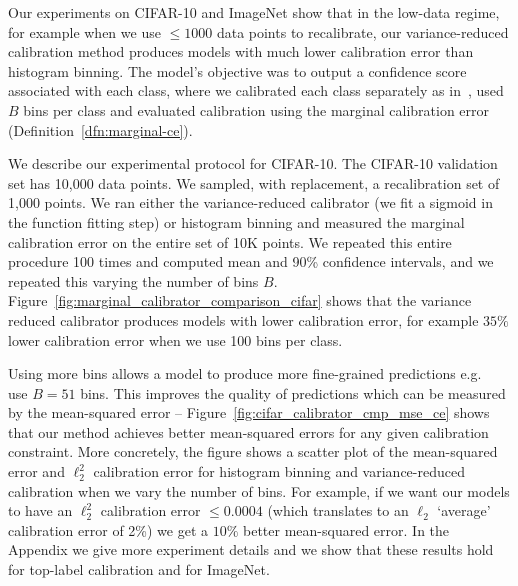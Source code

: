 Our experiments on CIFAR-10 and ImageNet show that in the low-data regime, for example when we use $\leq 1000$ data points to recalibrate, our variance-reduced calibration method produces models with much lower calibration error than histogram binning. The model's objective was to output a confidence score associated with each class, where we calibrated each class separately as in~\cite{zadrozny2002transforming}, used $B$ bins per class and evaluated calibration using the marginal calibration error (Definition~\ref{dfn:marginal-ce}).

We describe our experimental protocol for CIFAR-10.
The CIFAR-10 validation set has 10,000 data points. We sampled, with replacement, a recalibration set of 1,000 points. We ran either the variance-reduced calibrator (we fit a sigmoid in the function fitting step) or histogram binning and measured the marginal calibration error on the entire set of 10K points.
We repeated this entire procedure 100 times and computed mean and 90\% confidence intervals, and we repeated this varying the number of bins $B$. Figure~\ref{fig:marginal_calibrator_comparison_cifar} shows that the variance reduced calibrator produces models with lower calibration error, for example $35\%$ lower calibration error when we use 100 bins per class.

Using more bins allows a model to produce more fine-grained predictions e.g.~\cite{brocker2012empirical} use $B = 51$ bins. This improves the quality of predictions which can be measured by the mean-squared error -- Figure~\ref{fig:cifar_calibrator_cmp_mse_ce} shows that our method achieves better mean-squared errors for any given calibration constraint. More concretely, the figure shows a scatter plot of the mean-squared error and $\ell_2^2$ calibration error for histogram binning and variance-reduced calibration when we vary the number of bins. For example, if we want our models to have an $\ell_2^2$ calibration error $\leq 0.0004$ (which translates to an $\ell_2$ `average' calibration error of 2\%) we get a $10\%$ better mean-squared error. In the Appendix we give more experiment details and we show that these results hold for top-label calibration and for ImageNet.

